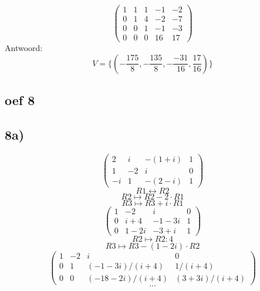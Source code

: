 \documentclass[10pt,a4paper]{article}
\begin{document}
\[
\begin{pmatrix}
1 & 1 & 1 & -1 & -2\\
0 & 1 & 4 & -2 & -7\\
0 & 0 & 1 & -1 & -3\\
0 & 0 & 0 & 16 & 17
\end{pmatrix}
\]
Antwoord:
\[
V = \{(-\frac{175}{8},-\frac{135}{8}, -\frac{-31}{16}, \frac{17}{16})\}
\]
\subsection*{oef 8}
\subsection*{8a)}
\[
\begin{pmatrix}
2 &  i &  -(1+i) & 1 \\
1 &  -2 &  i & 0 \\
-i &  1 &  -(2-i) & 1
\end{pmatrix}
\]
\[ R1 \leftrightarrow R2\]
\[ R2 \longmapsto R2 -2\cdot R1\]
\[ R3 \longmapsto R3 +i\cdot R1\]
\[
\begin{pmatrix}
1 &  -2 &  i & 0 \\
0 &  i+4 &  -1-3i & 1 \\
0 &  1-2i &  -3+i & 1
\end{pmatrix}
\]
\[ R2 \longmapsto R2 : 4\]
\[ R3 \longmapsto R3 -(1-2i)\cdot R2\]
\[
\begin{pmatrix}
1 &  -2 &  i & 0 \\
0 &  1 &  (-1-3i)/(i+4) & 1/(i+4) \\
0 &  0 &  (-18-2i)/(i+4) & (3+3i)/(i+4)
\end{pmatrix}
\]
\[...\]
\end{document}
